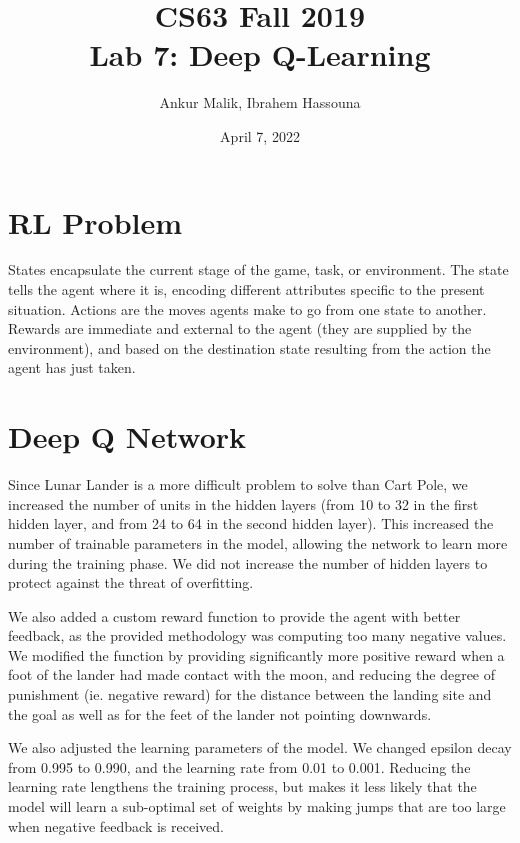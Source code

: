 \documentclass[11pt]{article}
\title{CS63 Fall 2019\\Lab 7: Deep Q-Learning}
\author{Ankur Malik, Ibrahem Hassouna}
\date{April 7, 2022}
\begin{document}
\maketitle

\section{RL Problem}

States encapsulate the current stage of the game, task, or environment. The state tells the agent where it is, encoding different attributes specific to the present situation.
Actions are the moves agents make to go from one state to another.
Rewards are immediate and external to the agent (they are supplied by the environment), and based on the destination state resulting from the action the agent has just taken.

\section{Deep Q Network}

Since Lunar Lander is a more difficult problem to solve than Cart Pole, we increased the number of units in the hidden layers (from 10 to 32 in the first hidden layer, and from 24 to 64 in the second hidden layer). This increased the number of trainable parameters in the model, allowing the network to learn more during the training phase. We did not increase the number of hidden layers to protect against the threat of overfitting.

\vspace{5mm}

We also added a custom reward function to provide the agent with better feedback, as the provided methodology was computing too many negative values. We modified the function by providing significantly more positive reward when a foot of the lander had made contact with the moon, and reducing the degree of punishment (ie. negative reward) for the distance between the landing site and the goal as well as for the feet of the lander not pointing downwards.

\vspace{5mm}

We also adjusted the learning parameters of the model. We changed epsilon decay from 0.995 to 0.990, and the learning rate from 0.01 to 0.001. Reducing the learning rate lengthens the training process, but makes it less likely that the model will learn a sub-optimal set of weights by making jumps that are too large when negative feedback is received.
\end{document}
